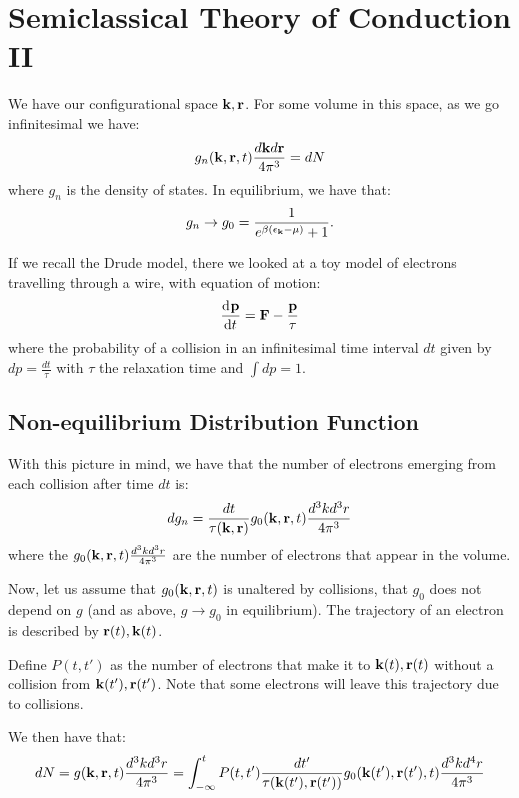 \section{Semiclassical Theory of Conduction II}
We have our configurational space $\mathbf{k}, \mathbf{r}$. For some volume in this space, as we go infinitesimal we have:
\begin{equation}
    g_n(\mathbf{k}, \mathbf{r}, t) \frac{d\mathbf{k}d\mathbf{r}}{4\pi^3} = dN
\end{equation}
where $g_n$ is the density of states. In equilibrium, we have that:
\begin{equation}
    g_n \to g_0 = \frac{1}{e^{\beta(\epsilon_{\mathbf{k}} - \mu)} + 1}.
\end{equation}

If we recall the Drude model, there we looked at a toy model of electrons travelling through a wire, with equation of motion:
\begin{equation}
    \dod{\v{p}}{t} = \v{F} - \frac{\v{p}}{\tau}
\end{equation}
where the probability of a collision in an infinitesimal time interval $dt$ given by $dp = \frac{dt}{\tau}$ with $\tau$ the relaxation time and $\int dp = 1$. 

\subsection{Non-equilibrium Distribution Function}
 With this picture in mind, we have that the number of electrons emerging from each collision after time $dt$ is:
\begin{equation}
    dg_n = \frac{dt}{\tau(\mathbf{k}, \mathbf{r})}g_0(\mathbf{k}, \mathbf{r}, t)\frac{d^3kd^3r}{4\pi^3}
\end{equation}
where the $g_0(\mathbf{k}, \mathbf{r}, t)\frac{d^3kd^3r}{4\pi^3}$ are the number of electrons that appear in the volume.

Now, let us assume that $g_0(\mathbf{k}, \mathbf{r}, t)$ is unaltered by collisions, that $g_0$ does not depend on $g$ (and as above, $g \to g_0$ in equilibrium). The trajectory of an electron is described by $\mathbf{r}(t), \mathbf{k}(t)$. 

Define $P(t, t')$ as the number of electrons that make it to $\mathbf{k}(t), \mathbf{r}(t)$ without a collision from $\mathbf{k}(t'), \mathbf{r}(t')$. Note that some electrons will leave this trajectory due to collisions.

We then have that:
\begin{equation}
    dN = g(\mathbf{k}, \mathbf{r}, t)\frac{d^3kd^3r}{4\pi^3}= \int_{-\infty}^t P(t, t')\frac{dt'}{\tau(\mathbf{k}(t'), \mathbf{r}(t'))}g_0(\mathbf{k}(t'), \mathbf{r}(t'), t)\frac{d^3kd^4r}{4\pi^3}
\end{equation}

